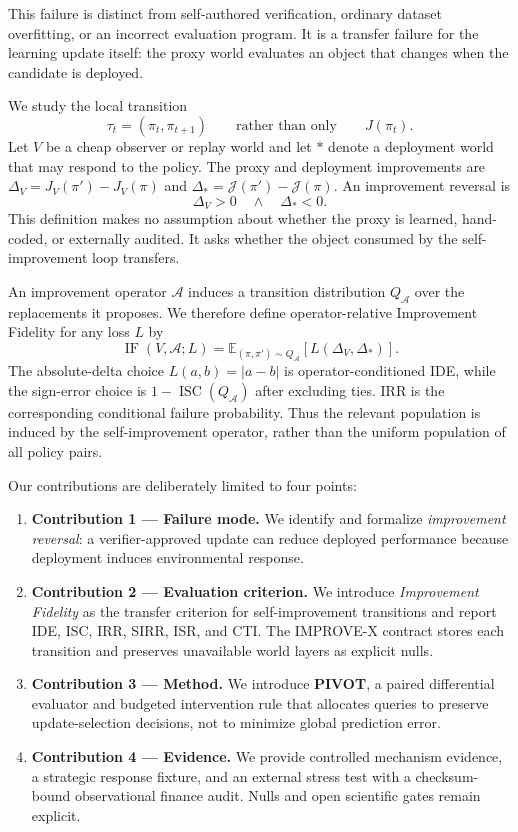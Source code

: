 \documentclass{article} %
\newcommand{\J}{\mathcal{J}}
\newcommand{\pii}{\pi}
\newcommand{\pip}{\pi'}
\newcommand{\dproxy}{\Delta_V}
\newcommand{\dtrue}{\Delta_*}
\begin{document}
This failure is distinct from self-authored verification, ordinary dataset
overfitting, or an incorrect evaluation program. It is a transfer failure for
the learning update itself: the proxy world evaluates an object that changes
when the candidate is deployed.

We study the local transition
\begin{equation}
    \tau_t=(\pi_t,\pi_{t+1})
    \qquad\text{rather than only}\qquad J(\pi_t).
\end{equation}
Let $V$ be a cheap observer or replay world and let $*$ denote a deployment
world that may respond to the policy. The proxy and deployment improvements
are $\dproxy=J_V(\pip)-J_V(\pii)$ and
$\dtrue=\J(\pip)-\J(\pii)$. An improvement reversal is
\begin{equation}
    \dproxy>0\quad\land\quad\dtrue<0.
\end{equation}
This definition makes no assumption about whether the proxy is learned,
hand-coded, or externally audited. It asks whether the object consumed by the
self-improvement loop transfers.

An improvement operator $\mathcal A$ induces a transition distribution
$Q_{\mathcal A}$ over the replacements it proposes. We therefore define
operator-relative Improvement Fidelity for any loss $L$ by
\begin{equation}
  \operatorname{IF}(V,\mathcal A;L)
  =\mathbb E_{(\pi,\pi')\sim Q_{\mathcal A}}
    \left[L\!\left(\Delta_V,\Delta_*\right)\right].
\end{equation}
The absolute-delta choice $L(a,b)=|a-b|$ is operator-conditioned IDE, while
the sign-error choice is $1-\operatorname{ISC}(Q_{\mathcal A})$ after excluding
ties. IRR is the corresponding conditional failure probability. Thus the
relevant population is induced by the self-improvement operator, rather than
the uniform population of all policy pairs.

Our contributions are deliberately limited to four points:
\begin{enumerate}
  \item \textbf{Contribution 1 --- Failure mode.} We identify and formalize
  \emph{improvement reversal}: a verifier-approved update can reduce deployed
  performance because deployment induces environmental response.
  \item \textbf{Contribution 2 --- Evaluation criterion.} We introduce
  \emph{Improvement Fidelity} as the transfer criterion for self-improvement
  transitions and report IDE, ISC, IRR, SIRR, ISR, and CTI. The IMPROVE-X
  contract stores each transition and preserves unavailable world layers as
  explicit nulls.
  \item \textbf{Contribution 3 --- Method.} We introduce \textbf{PIVOT}, a
  paired differential evaluator and budgeted intervention rule that allocates
  queries to preserve update-selection decisions, not to minimize global
  prediction error.
  \item \textbf{Contribution 4 --- Evidence.} We provide controlled
  mechanism evidence, a strategic response fixture, and an external stress
  test with a checksum-bound observational finance audit. Nulls and open
  scientific gates remain explicit.
\end{enumerate}
\end{document}
